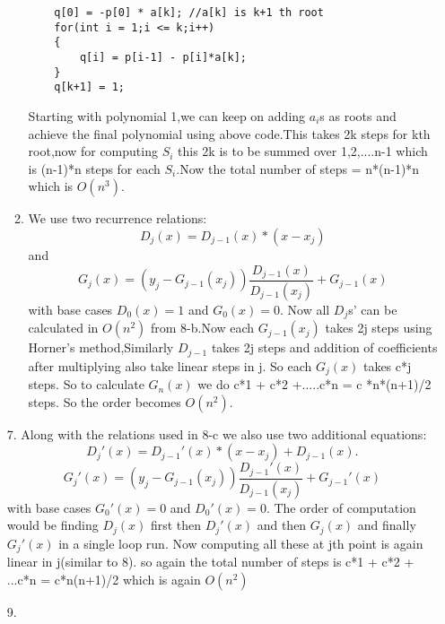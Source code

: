 \documentclass[12pt]{article}
\begin{document}
\begin{enumerate}
\begin{enumerate}
    \begin{verbatim}
    q[0] = -p[0] * a[k]; //a[k] is k+1 th root
    for(int i = 1;i <= k;i++)
    {
        q[i] = p[i-1] - p[i]*a[k];
    }
    q[k+1] = 1;
    \end{verbatim}
Starting with polynomial 1,we can keep on adding $a_i$s as roots and achieve the final polynomial using above code.This takes 2k steps for kth root,now for computing $S_i$ this 2k is to be summed over 1,2,....n-1 which is (n-1)*n steps for each $S_i$.Now the total number of steps = n*(n-1)*n which is $O(n^3)$.
\item
We use two recurrence relations:
\begin{equation*}
D_j(x) = D_{j-1}(x) *(x - x_{j})
\end{equation*}
and 
\begin{equation*}
G_j(x) = (y_j - G_{j-1}(x_j)) \frac{D_{j-1}(x)}{D_{j-1}(x_j)} + G_{j-1}(x)
\end{equation*}
with base cases $D_0(x) = 1$ and $G_0(x) = 0$.
Now all $D_j$s' can be calculated in $O(n^2)$ from 8-b.Now each $G_{j-1}(x_j)$ takes 2j steps using Horner's method,Similarly $D_{j-1}$ takes 2j steps and addition of coefficients after multiplying also take linear steps in j.
So each $G_j(x)$ takes c*j steps. So to calculate $G_n(x)$ we do c*1 + c*2 +.....c*n = c *n*(n+1)/2 steps. So the order becomes $O(n^2)$.
\end{enumerate}
 \item[7.]
    Along with the relations used in 8-c we also use two additional equations:
    \begin{equation*}
        D_j'(x) = D_{j-1}'(x) * (x-x_j) + D_{j-1}(x).
    \end{equation*}
    \begin{equation*}
        G_j'(x) = (y_j - G_{j-1}(x_j)) \frac{D_{j-1}'(x)}{D_{j-1}(x_j)} + G_{j-1}'(x)
    \end{equation*}
    with base cases $G_0'(x) = 0$ and $D_0'(x) = 0$.
    The order of computation would be finding $D_j(x)$ first then $D_j'(x)$ and then $G_j(x)$ and finally $G_j'(x)$ in a single loop run.
    Now computing all these at jth point is again linear in j(similar to 8). so again the total number of steps is c*1 + c*2 + ...c*n = c*n(n+1)/2 which is again $O(n^2)$
    \item[9.]
\end{enumerate}
\end{document}
